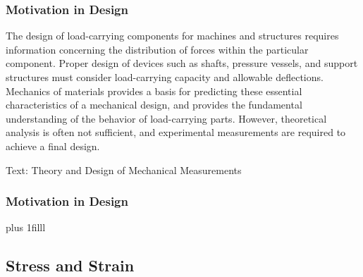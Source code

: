 \documentclass[fleqn]{beamer} %
\newcommand{\sectionIsubsectionItitle}{Motivation in Design}
\newcommand{\sectionIsubsectionIItitle}{Stress and Strain}
\newcommand{\btVFill}{\vskip0pt plus 1filll}
\begin{document}
			\begin{frame}
				\frametitle{\sectionIsubsectionItitle}

				The design of load-carrying components for machines and structures requires information concerning the {\BL distribution of forces within the particular component}. Proper design of devices such as shafts, pressure vessels, and support structures must consider {\PR load-carrying capacity and allowable deflections}. Mechanics of materials provides a basis for predicting these essential characteristics of a mechanical design, and provides the fundamental understanding of the behavior of load-carrying parts. However, theoretical analysis is often not sufficient, and {\PN experimental measurements} are required to achieve a final design.

				{\tiny Text: Theory and Design of Mechanical Measurements}
		
			\end{frame}

			\begin{frame}
				\frametitle{\sectionIsubsectionItitle}


				\btVFill
			
			\end{frame}


		\subsection{\sectionIsubsectionIItitle}\label{sectionIsubsectionII}
\end{document}
